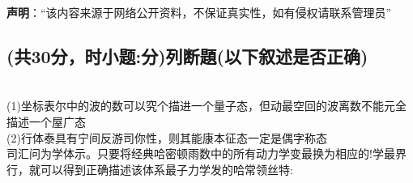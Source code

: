 
\textbf{声明}：“该内容来源于网络公开资料，不保证真实性，如有侵权请联系管理员”


\subsection{(共30分，时小题:分)列断題(以下叙述是否正确)}
\\(1)坐标表尔中的波的数可以究个描进一个量子态，但动最空回的波离数不能元全描述一个屋广态\\
(2)行体泰具有宁间反游司你性，则其能康本征态一定是偶字称态\\
司汇问为学体示。只要将经典哈密顿雨数中的所有动力学变最换为相应的!学最界行，就可以得到正确描述该体系最子力学发的哈常领丝特: